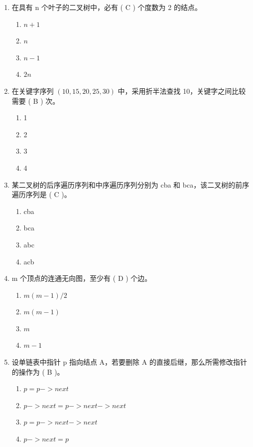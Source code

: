 \documentclass[12pt, a4paper]{article}
\begin{document}
\begin{enumerate}[label=\arabic*.]
    \item 在具有 n 个叶子的二叉树中，必有 ( C ) 个度数为 2 的结点。
    \begin{enumerate}
        \item $n+1$
        \item $n$
        \item $n-1$
        \item $2n$
    \end{enumerate}

    \item 在关键字序列 $(10, 15, 20, 25, 30)$ 中，采用折半法查找 10，关键字之间比较需要 ( B ) 次。
    \begin{enumerate}
        \item 1
        \item 2
        \item 3
        \item 4
    \end{enumerate}

    \item 某二叉树的后序遍历序列和中序遍历序列分别为 cba 和 bca，该二叉树的前序遍历序列是 ( C )。
    \begin{enumerate}
        \item cba
        \item bca
        \item abc
        \item acb
    \end{enumerate}

    \item m 个顶点的连通无向图，至少有 ( D ) 个边。
    \begin{enumerate}
        \item $m(m-1)/2$
        \item $m(m-1)$
        \item $m$
        \item $m-1$
    \end{enumerate}

    \item 设单链表中指针 p 指向结点 A，若要删除 A 的直接后继，那么所需修改指针的操作为 ( B )。
    \begin{enumerate}
        \item $p = p->next$
        \item $p->next = p->next->next$
        \item $p = p->next->next$
        \item $p->next = p$
    \end{enumerate}


\end{enumerate}
\end{document}
